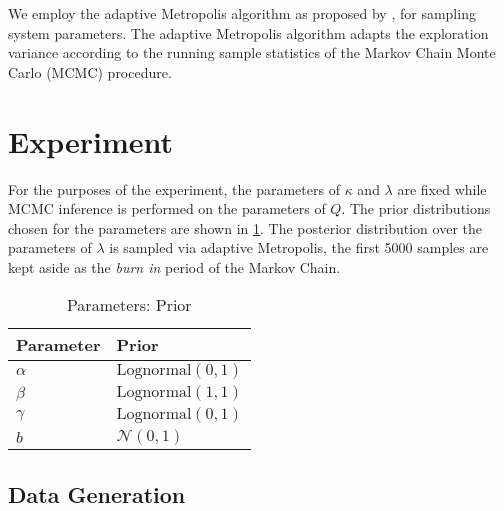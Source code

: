 We employ the adaptive Metropolis algorithm as proposed by \citet{haario2001}, for sampling
system parameters. The adaptive Metropolis algorithm adapts the exploration variance according to 
the running sample statistics of the Markov Chain Monte Carlo (MCMC) procedure.


\section{Experiment}\label{sec:exp}

For the purposes of the experiment, the parameters of $\kappa$ and $\lambda$ are fixed while MCMC 
inference is performed on the parameters of $Q$. The prior distributions chosen for the parameters 
are shown in \cref{tab:prior}. The posterior distribution over the parameters of $\lambda$ is 
sampled via adaptive Metropolis, the first 5000 samples are kept aside as the \emph{burn in} period
of the Markov Chain.

\begin{table}[t]
  \caption{Parameters: Prior}
  \label{tab:prior}
  \centering
  \begin{tabular}{ll}
    \hline
    \textbf{Parameter} & \textbf{Prior}\\
    \hline
    $\alpha$ & $\text{Lognormal}(0, 1)$ \\
    $\beta$  & $\text{Lognormal}(1, 1)$ \\ 
    $\gamma$ & $\text{Lognormal}(0, 1)$ \\ 
    $b$ & $\mathcal{N}(0, 1)$ \\
    \hline
  \end{tabular}
\end{table}


\subsection*{Data Generation}

